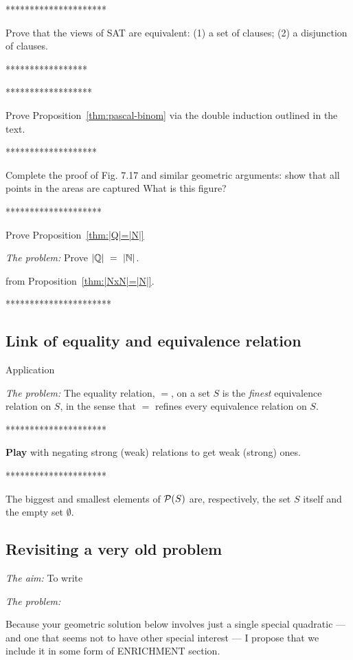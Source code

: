 *********************

Prove that the views of SAT are equivalent: (1) a set of clauses; (2)
a disjunction of clauses.

*****************



******************

Prove Proposition~\ref{thm:pascal-binom} via the double induction
outlined in the text.


*******************

Complete the proof of Fig. 7.17 and similar geometric arguments: show
that all points in the areas are captured
{\Denis What is this figure?}

********************

Prove Proposition~\ref{thm:|Q|=|N|}

\noindent \textit{The problem:}
Prove $|\Q| \ = \ |\N|$.
\medskip

from Proposition~\ref{thm:|NxN|=|N|}.





**********************

\subsection{Link of equality and equivalence relation}
Application

\noindent \textit{The problem:}
The equality relation, $=$, on a set $S$ is the {\em finest}
equivalence relation on $S$, in the sense that $=$ refines every
equivalence relation on $S$.
\medskip

*********************

\textbf{ Play} with negating strong (weak) relations to get weak (strong) ones.
 


*********************

 The biggest and smallest elements of
${\cal P}(S)$ are, respectively, the set $S$ itself and the empty set
$\emptyset$.

\subsection{Revisiting a very old problem}

\noindent \textit{The aim:}
To write
\medskip

\noindent \textit{The problem:}

{\Arny Because your geometric solution below involves just a single
  special quadratic --- and one that seems not to have other special
  interest --- I propose that we include it in some form of ENRICHMENT
  section.  }

